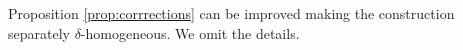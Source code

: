 \documentclass[12pt, reqno]{amsart}
\theoremstyle{plain}
\newtheorem {corollary} [theorem]{Corollary}
\theoremstyle{definition}
\theoremstyle{remark}
\numberwithin{equation}{section}
\newcommand{\R}{\mathbb{R}}
\newcommand{\D}{\mathcal{D}}
\newcommand{\I}{\mathcal{I}}
\newcommand{\0}{\theta}
\renewcommand{\b}{\beta}
\newcommand{\1}{{-1}}
\newcommand{\sgn}{\mathrm{sgn}}
\renewcommand{\l}{\ell}
\renewcommand{\=}{\coloneqq}
\renewcommand{\.}{\dots}
\newcommand{\mc}{\mathcal}
\newcommand{\dom}{\mathrm{dom}}
\newcommand{\be}{\begin{equation}}
\newcommand{\ee}{\end{equation}}
\begin{document}
{\color{black} Proposition \ref{prop:corrrections} can be improved making the construction   separately $\delta$-homogeneous. We omit the details.

}
%
%
%
%
%
%
%
%
% 
% 
%
%
% 
% 
\end{document}

